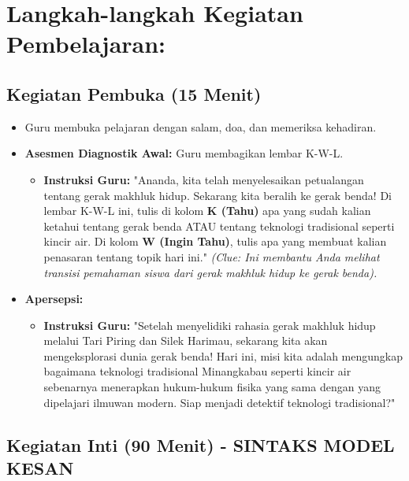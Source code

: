 \documentclass[a4paper,12pt]{article}
\begin{document}
\section{Langkah-langkah Kegiatan Pembelajaran:}

\subsection{Kegiatan Pembuka (15 Menit)}
\begin{itemize}
\item Guru membuka pelajaran dengan salam, doa, dan memeriksa kehadiran.
\item \textbf{Asesmen Diagnostik Awal:} Guru membagikan lembar K-W-L.
    \begin{itemize}
    \item \textbf{Instruksi Guru:} "Ananda, kita telah menyelesaikan petualangan tentang gerak makhluk hidup. Sekarang kita beralih ke gerak benda! Di lembar K-W-L ini, tulis di kolom \textbf{K (Tahu)} apa yang sudah kalian ketahui tentang gerak benda ATAU tentang teknologi tradisional seperti kincir air. Di kolom \textbf{W (Ingin Tahu)}, tulis apa yang membuat kalian penasaran tentang topik hari ini." \textit{(Clue: Ini membantu Anda melihat transisi pemahaman siswa dari gerak makhluk hidup ke gerak benda).}
    \end{itemize}
\item \textbf{Apersepsi:}
    \begin{itemize}
    \item \textbf{Instruksi Guru:} "Setelah menyelidiki rahasia gerak makhluk hidup melalui Tari Piring dan Silek Harimau, sekarang kita akan mengeksplorasi dunia gerak benda! Hari ini, misi kita adalah mengungkap bagaimana teknologi tradisional Minangkabau seperti kincir air sebenarnya menerapkan hukum-hukum fisika yang sama dengan yang dipelajari ilmuwan modern. Siap menjadi detektif teknologi tradisional?"
    \end{itemize}
\end{itemize}

\subsection{Kegiatan Inti (90 Menit) - SINTAKS MODEL KESAN}
\end{document}

